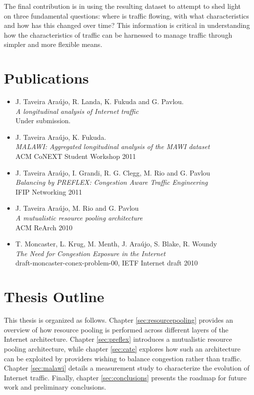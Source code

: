 The final contribution is in using the resulting dataset to attempt to shed light on three fundamental questions: where is traffic flowing, with what characteristics and how has this changed over time? This information is critical in understanding how the characteristics of traffic can be harnessed to manage traffic through simpler and more flexible means.



\section{Publications}
\label{sec:introduction:contributions}

\begin{itemize}
    \item J. Taveira Ara\'{u}jo, R. Landa, K. Fukuda and G. Pavlou. \\
            \emph{A longitudinal analysis of Internet traffic} \\
            Under submission.
    \item J. Taveira Ara\'{u}jo, K. Fukuda. \\
            \emph{MALAWI: Aggregated longitudinal analysis of the MAWI dataset} \\
            {ACM CoNEXT Student Workshop 2011}
    \item J. Taveira Ara\'{u}jo, I. Grandi, R. G. Clegg, M. Rio and G. Pavlou \\
            \emph{Balancing by PREFLEX: Congestion Aware Traffic Engineering} \\
            {IFIP Networking 2011}
    \item J. Taveira Ara\'{u}jo, M. Rio and G. Pavlou \\
        \emph{A mutualistic resource pooling architecture} \\
        {ACM ReArch 2010}
    \item T. Moncaster, L. Krug, M. Menth, J. Ara\'{u}jo, S. Blake, R. Woundy \\
        \emph{The Need for Congestion Exposure in the Internet} \\
        {draft-moncaster-conex-problem-00, IETF Internet draft 2010}
\end{itemize}

\section{Thesis Outline}
\label{sec:introduction:outline}

This thesis is organized as follows.
Chapter \ref{sec:resourcepooling} provides an overview of how resource pooling is performed across different layers of the Internet architecture.
Chapter \ref{sec:preflex} introduces a mutualistic resource pooling architecture, while chapter \ref{sec:cate} explores how such an architecture can be exploited by providers wishing to balance congestion rather than traffic.
Chapter \ref{sec:malawi} details a measurement study to characterize the evolution of Internet traffic.
Finally, chapter \ref{sec:conclusions} presents the roadmap for future work and preliminary conclusions.

